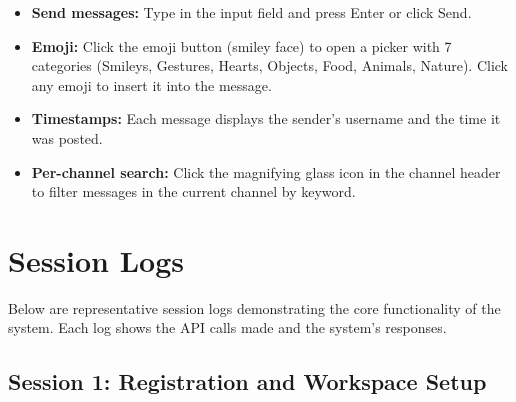 \documentclass[11pt]{article}
\begin{document}
\begin{itemize}
    \item \textbf{Send messages:} Type in the input field and press Enter or click Send.
    \item \textbf{Emoji:} Click the emoji button (smiley face) to open a picker with 7 categories (Smileys, Gestures, Hearts, Objects, Food, Animals, Nature). Click any emoji to insert it into the message.
    \item \textbf{Timestamps:} Each message displays the sender's username and the time it was posted.
    \item \textbf{Per-channel search:} Click the magnifying glass icon in the channel header to filter messages in the current channel by keyword.
\end{itemize}


\newpage
\section{Session Logs}
\label{sec:session}

Below are representative session logs demonstrating the core functionality of the system. Each log shows the API calls made and the system's responses.

\subsection{Session 1: Registration and Workspace Setup}
\end{document}
